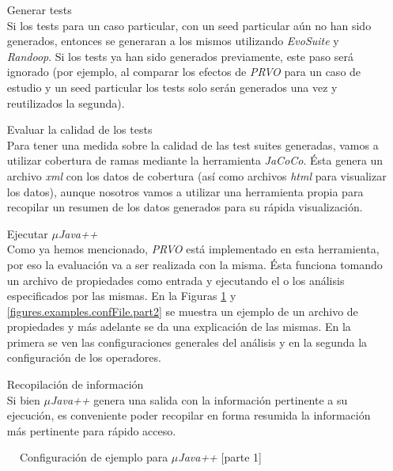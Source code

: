 \begin{enumerate}[leftmargin=.75cm,align=left,style=nextline]
	\item[Generar tests]\mbox{}\\ Si los tests para un caso particular, con un seed particular a\'un no han sido generados, entonces se generaran a los mismos utilizando \emph{EvoSuite} y \emph{Randoop}. Si los tests ya han sido generados previamente, este paso ser\'a ignorado (por ejemplo, al comparar los efectos de \emph{PRVO} para un caso de estudio y un seed particular los tests solo ser\'an generados una vez y reutilizados la segunda).
	
	\item[Evaluar la calidad de los tests]\mbox{}\\ Para tener una medida sobre la calidad de las test suites generadas, vamos a utilizar cobertura de ramas mediante la herramienta \emph{JaCoCo}. \'Esta genera un archivo \emph{xml} con los datos de cobertura (as\'i como archivos \emph{html} para visualizar los datos), aunque nosotros vamos a utilizar una herramienta propia para recopilar un resumen de los datos generados para su r\'apida visualizaci\'on.
	
	\item[Ejecutar \emph{$\mu$Java++}]\mbox{}\\ Como ya hemos mencionado, \emph{PRVO} est\'a implementado en esta herramienta, por eso la evaluaci\'on va a ser realizada con la misma. \'Esta funciona tomando un archivo de propiedades como entrada y ejecutando el o los an\'alisis especificados por las mismas. En la Figuras \ref{figures.examples.confFile.part1} y \ref{figures.examples.confFile.part2} se muestra un ejemplo de un archivo de propiedades y m\'as adelante se da una explicaci\'on de las mismas. En la primera se ven las configuraciones generales del an\'alisis y en la segunda la configuraci\'on de los operadores.
	
	\item[Recopilaci\'on de informaci\'on]\mbox{}\\ Si bien \emph{$\mu$Java++} genera una salida con la informaci\'on pertinente a su ejecuci\'on, es conveniente poder recopilar en forma resumida la informaci\'on m\'as pertinente para r\'apido acceso.
\end{enumerate}

\begin{figure}
	
	\caption{Configuraci\'on de ejemplo para \emph{$\mu$Java++} [parte 1]}
	\label{figures.examples.confFile.part1}
\end{figure}

